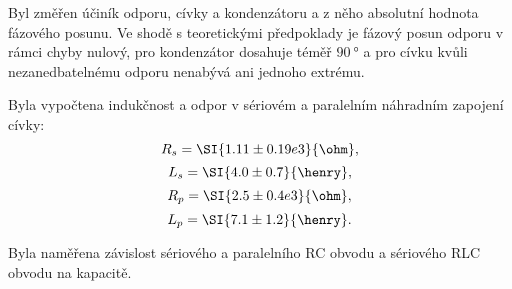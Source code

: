 \documentclass[0-protokol.tex]{subfiles}
\begin{document}
Byl změřen účiník odporu, cívky a kondenzátoru a z něho absolutní hodnota fázového posunu. Ve shodě s teoretickými předpoklady je fázový posun odporu v rámci chyby nulový, pro kondenzátor dosahuje téměř $\SI{90}{\degree}$ a pro cívku kvůli nezanedbatelnému odporu nenabývá ani jednoho extrému.

Byla vypočtena indukčnost a odpor v sériovém a paralelním náhradním zapojení cívky:
$$ R_s = \SI{1.11 \pm 0.19 e3}{\ohm}, $$
$$ L_s = \SI{4.0 \pm 0.7}{\henry}, $$
$$ R_p = \SI{2.5 \pm 0.4 e3}{\ohm}, $$
$$ L_p = \SI{7.1 \pm 1.2}{\henry}. $$

Byla naměřena závislost sériového a paralelního RC obvodu a sériového RLC obvodu na kapacitě.
\end{document}
